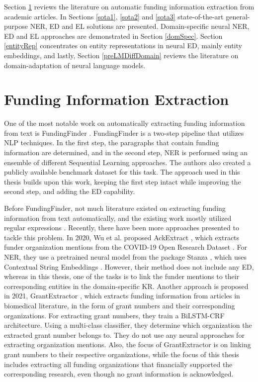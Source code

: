 \documentclass{report}
\theoremstyle{definition}
\theoremstyle{remark}
\begin{document}
Section \ref{FundingDataExtraction} reviews the literature on automatic funding information extraction from academic articles. In Sections \ref{sota1}, \ref{sota2} and \ref{sota3} state-of-the-art general-purpose NER, ED and EL solutions are presented. Domain-specific neural NER, ED and EL approaches are demonstrated in Section \ref{domSpec}. Section \ref{entityRep} concentrates on entity representations in neural ED, mainly entity embeddings, and lastly, Section \ref{preLMDiffDomain} reviews the literature on domain-adaptation of neural language models.

\section{Funding Information Extraction}
\label{FundingDataExtraction}

    One of the most notable work on automatically extracting funding information from text is FundingFinder \cite{ElsPaper}. FundingFinder is a two-step pipeline that utilizes NLP techniques. In the first step, the paragraphs that contain funding information are determined, and in the second step, NER is performed using an ensemble of different Sequential Learning approaches. The authors also created a publicly available benchmark dataset for this task. The approach used in this thesis builds upon this work, keeping the first step intact while improving the second step, and adding the ED capability. 
    
    Before FundingFinder, not much literature existed on extracting funding information from text automatically, and the existing work mostly utilized regular expressions \cite{ElsPaper}. Recently, there have been more approaches presented to tackle this problem. In 2020, Wu et al. proposed AckExtract  \cite{AckExtract}, which extracts funder organization mentions from the COVID-19 Open Research Dataset \cite{CORD}. For NER, they use a pretrained neural model from the package Stanza \cite{stanza}, which uses Contextual String Embeddings \cite{flairpaper}. However, their method does not include any ED, whereas in this thesis, one of the tasks is to link the funder mentions to their corresponding entities in the domain-specific KR. Another approach is proposed in 2021, GrantExtractor \cite{GrantExtractor}, which extracts funding information from articles in biomedical literature, in the form of grant numbers and their corresponding organizations. For extracting grant numbers, they train a BiLSTM-CRF \cite{BiLSTMCRF} architecture. Using a multi-class classifier, they determine which organization the extracted grant number belongs to. They do not use any neural approaches for extracting organization mentions. Also, the focus of GrantExtractor is on linking grant numbers to their respective organizations, while the focus of this thesis includes extracting all funding organizations that financially supported the corresponding research, even though no grant information is acknowledged.
\end{document}
